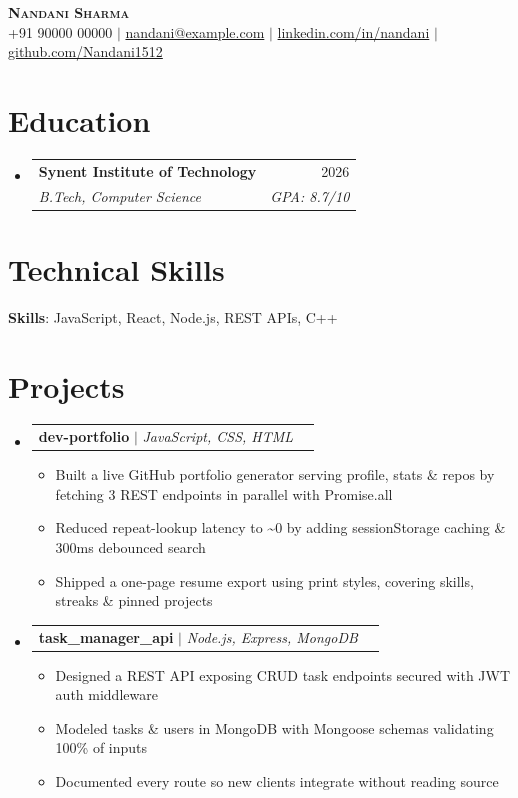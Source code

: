 \documentclass[letterpaper,11pt]{article}
\makeatletter
\newcommand{\resumeItem}[1]{\item\small{{#1 \vspace{-2pt}}}}
\newcommand{\resumeSubheading}[4]{
  \vspace{-2pt}\item
    \begin{tabular*}{0.97\textwidth}[t]{l@{\extracolsep{\fill}}r}
      \textbf{#1} & #2 \\
      \textit{\small#3} & \textit{\small #4} \\
    \end{tabular*}\vspace{-7pt}
}
\newcommand{\resumeProjectHeading}[2]{
    \item
    \begin{tabular*}{0.97\textwidth}{l@{\extracolsep{\fill}}r}
      \small#1 & #2 \\
    \end{tabular*}\vspace{-7pt}
}
\newcommand{\resumeSubHeadingListStart}{\begin{itemize}[leftmargin=0.15in, label={}]}
\newcommand{\resumeSubHeadingListEnd}{\end{itemize}}
\newcommand{\resumeItemListStart}{\begin{itemize}}
\newcommand{\resumeItemListEnd}{\end{itemize}\vspace{-5pt}}
\makeatother
\begin{document}
\begin{center}
    \textbf{\Huge \scshape Nandani Sharma} \\ \vspace{1pt}
    \small +91 90000 00000 $|$ \href{mailto:nandani@example.com}{nandani@example.com} $|$ \href{https://linkedin.com/in/nandani}{linkedin.com/in/nandani} $|$ \href{https://github.com/Nandani1512}{github.com/Nandani1512}
\end{center}

\section{Education}
  \resumeSubHeadingListStart
    \resumeSubheading{Synent Institute of Technology}{2026}{B.Tech, Computer Science}{GPA: 8.7/10}
  \resumeSubHeadingListEnd

\section{Technical Skills}
 \begin{itemize}[leftmargin=0.15in, label={}]
    \small{\item{
     \textbf{Skills}{: JavaScript, React, Node.js, REST APIs, C++}
    }}
 \end{itemize}

\section{Projects}
    \resumeSubHeadingListStart
    \resumeProjectHeading
      {\textbf{dev-portfolio} $|$ \emph{JavaScript, CSS, HTML}}{}
      \resumeItemListStart
        \resumeItem{Built a live GitHub portfolio generator serving profile, stats \& repos by fetching 3 REST endpoints in parallel with Promise.all}
        \resumeItem{Reduced repeat-lookup latency to \textasciitilde{}0 by adding sessionStorage caching \& 300ms debounced search}
        \resumeItem{Shipped a one-page resume export using print styles, covering skills, streaks \& pinned projects}
      \resumeItemListEnd
    \resumeProjectHeading
      {\textbf{task\_manager\_api} $|$ \emph{Node.js, Express, MongoDB}}{}
      \resumeItemListStart
        \resumeItem{Designed a REST API exposing CRUD task endpoints secured with JWT auth middleware}
        \resumeItem{Modeled tasks \& users in MongoDB with Mongoose schemas validating 100\% of inputs}
        \resumeItem{Documented every route so new clients integrate without reading source}
      \resumeItemListEnd
    \resumeSubHeadingListEnd
\end{document}

